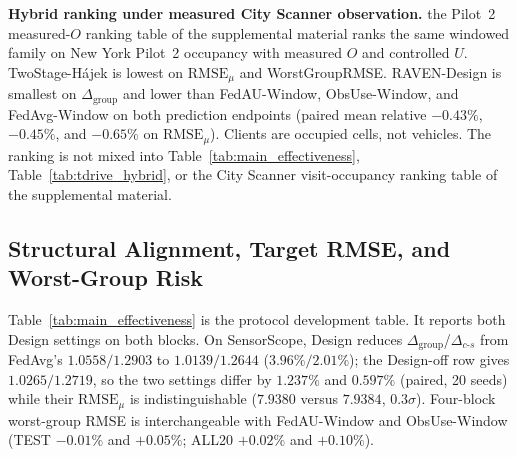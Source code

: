 \documentclass[letterpaper,journal]{IEEEtran}
\begin{document}
\noindent\textbf{Hybrid ranking under measured City Scanner observation.}
the Pilot~2 measured-$O$ ranking table of the supplemental material ranks the same windowed family on
New York Pilot~2 occupancy with measured $O$ and controlled $U$.
TwoStage-H\'ajek is lowest on $\mathrm{RMSE}_{\mu}$ and WorstGroupRMSE.
RAVEN-Design is smallest on $\Delta_{\mathrm{group}}$ and
lower than FedAU-Window, ObsUse-Window, and FedAvg-Window on both prediction endpoints
(paired mean relative $-0.43\%$, $-0.45\%$, and $-0.65\%$ on
$\mathrm{RMSE}_{\mu}$).
Clients are occupied cells, not vehicles.
The ranking is not mixed into Table~\ref{tab:main_effectiveness},
Table~\ref{tab:tdrive_hybrid}, or the City Scanner visit-occupancy ranking table of the supplemental material.

\subsection{Structural Alignment, Target RMSE, and Worst-Group Risk}
\label{subsec:eval_rq2}

Table~\ref{tab:main_effectiveness} is the protocol development table.  It
reports both Design settings on both blocks.
On SensorScope, Design reduces
$\Delta_{\mathrm{group}}$/$\Delta_{c\text{-}s}$ from FedAvg's
$1.0558/1.2903$ to $1.0139/1.2644$ ($3.96\%/2.01\%$); the Design-off row gives
$1.0265/1.2719$, so the two settings differ by $1.237\%$ and $0.597\%$
(paired, 20 seeds) while their $\mathrm{RMSE}_{\mu}$ is indistinguishable
($7.9380$ versus $7.9384$, $0.3\sigma$).  Four-block
worst-group RMSE is interchangeable with FedAU-Window and ObsUse-Window
(TEST $-0.01\%$ and $+0.05\%$; ALL20 $+0.02\%$ and $+0.10\%$).
\end{document}
